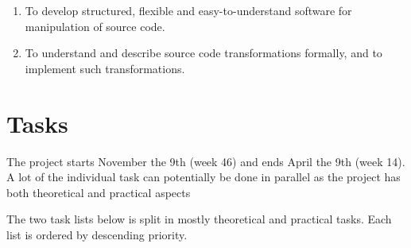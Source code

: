 \documentclass[a4paper,oneside]{article}
\begin{document}
\begin{enumerate}
\item To develop structured, flexible and easy-to-understand software for manipulation of source code.
\item To understand and describe source code transformations formally, and to implement such
  transformations.
\end{enumerate}


\section{Tasks}

The project starts November the 9th (week 46) and ends April the 9th (week
14). A lot of the individual task can potentially be done in parallel as the
project has both theoretical and practical aspects

The two task lists below is split in mostly theoretical and practical tasks. Each list is ordered by
descending priority.
\end{document}
